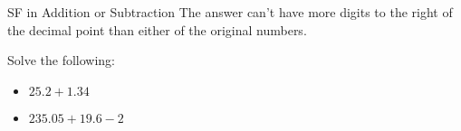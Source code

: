 \documentclass[notes=only]{beamer}
\begin{document}
\begin{frame}[t]{SF in Addition or Subtraction}
	The answer can't have more digits to the \alert{right} of the
	\alert{decimal point} than either of the original numbers.

	\bigskip


	\begin{example}
		Solve the following:
		\begin{itemize}
			\item $25.2 + 1.34$

				\bigskip

			\item $235.05 + 19.6 - 2$
		\end{itemize}
	\end{example}
\end{frame}

\end{document}
